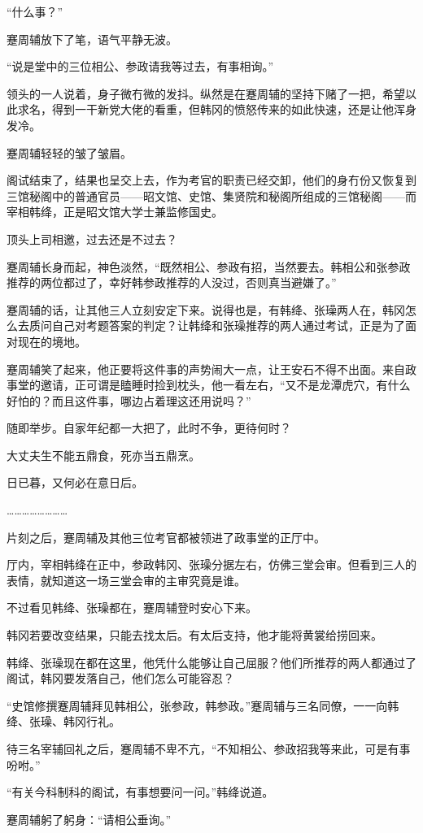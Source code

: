 “什么事？”

蹇周辅放下了笔，语气平静无波。

“说是堂中的三位相公、参政请我等过去，有事相询。”

领头的一人说着，身子微冇微的发抖。纵然是在蹇周辅的坚持下赌了一把，希望以此求名，得到一干新党大佬的看重，但韩冈的愤怒传来的如此快速，还是让他浑身发冷。

蹇周辅轻轻的皱了皱眉。

阁试结束了，结果也呈交上去，作为考官的职责已经交卸，他们的身冇份又恢复到三馆秘阁中的普通官员——昭文馆、史馆、集贤院和秘阁所组成的三馆秘阁——而宰相韩绛，正是昭文馆大学士兼监修国史。

顶头上司相邀，过去还是不过去？

蹇周辅长身而起，神色淡然，“既然相公、参政有招，当然要去。韩相公和张参政推荐的两位都过了，幸好韩参政推荐的人没过，否则真当避嫌了。”

蹇周辅的话，让其他三人立刻安定下来。说得也是，有韩绛、张璪两人在，韩冈怎么去质问自己对考题答案的判定？让韩绛和张璪推荐的两人通过考试，正是为了面对现在的境地。

蹇周辅笑了起来，他正要将这件事的声势闹大一点，让王安石不得不出面。来自政事堂的邀请，正可谓是瞌睡时捡到枕头，他一看左右，“又不是龙潭虎穴，有什么好怕的？而且这件事，哪边占着理这还用说吗？”

随即举步。自家年纪都一大把了，此时不争，更待何时？

大丈夫生不能五鼎食，死亦当五鼎烹。

日已暮，又何必在意日后。

……………………

片刻之后，蹇周辅及其他三位考官都被领进了政事堂的正厅中。

厅内，宰相韩绛在正中，参政韩冈、张璪分据左右，仿佛三堂会审。但看到三人的表情，就知道这一场三堂会审的主审究竟是谁。

不过看见韩绛、张璪都在，蹇周辅登时安心下来。

韩冈若要改变结果，只能去找太后。有太后支持，他才能将黄裳给捞回来。

韩绛、张璪现在都在这里，他凭什么能够让自己屈服？他们所推荐的两人都通过了阁试，韩冈要发落自己，他们怎么可能容忍？

“史馆修撰蹇周辅拜见韩相公，张参政，韩参政。”蹇周辅与三名同僚，一一向韩绛、张璪、韩冈行礼。

待三名宰辅回礼之后，蹇周辅不卑不亢，“不知相公、参政招我等来此，可是有事吩咐。”

“有关今科制科的阁试，有事想要问一问。”韩绛说道。

蹇周辅躬了躬身：“请相公垂询。”


